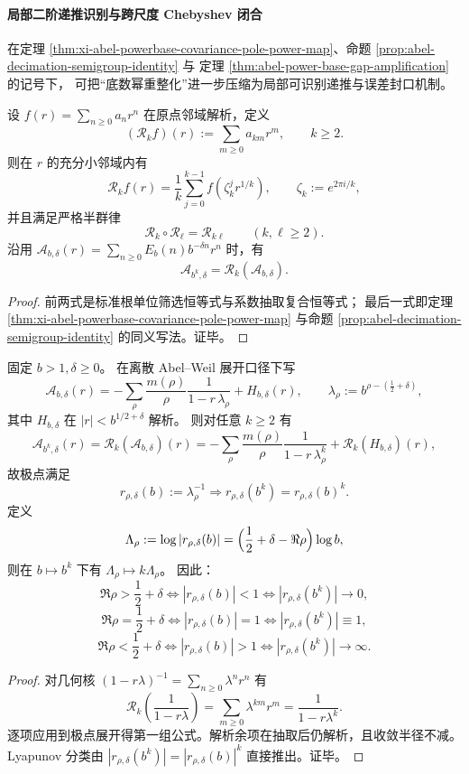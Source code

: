\paragraph{局部二阶递推识别与跨尺度 Chebyshev 闭合}
在定理 \ref{thm:xi-abel-powerbase-covariance-pole-power-map}、命题 \ref{prop:abel-decimation-semigroup-identity} 与
定理 \ref{thm:abel-power-base-gap-amplification} 的记号下，
可把“底数幂重整化”进一步压缩为局部可识别递推与误差封口机制。

\begin{proposition}[抽取算子的根单位滤波表示与半群闭合]\label{prop:xi-abel-Rk-root-filter-semigroup}
设 \(f(r)=\sum_{n\ge 0}a_n r^n\) 在原点邻域解析，定义
\[
(\mathcal R_k f)(r):=\sum_{m\ge 0}a_{km}r^m,\qquad k\ge 2.
\]
则在 \(r\) 的充分小邻域内有
\[
\mathcal R_k f(r)
=\frac1k\sum_{j=0}^{k-1}f\!\left(\zeta_k^j r^{1/k}\right),
\qquad
\zeta_k:=e^{2\pi i/k},
\]
并且满足严格半群律
\[
\mathcal R_k\circ\mathcal R_\ell=\mathcal R_{k\ell}\qquad(k,\ell\ge 2).
\]
沿用
\(
\mathcal A_{b,\delta}(r)=\sum_{n\ge 0}E_b(n)b^{-\delta n}r^n
\)
时，有
\[
\mathcal A_{b^k,\delta}=\mathcal R_k(\mathcal A_{b,\delta}).
\]
\end{proposition}
\begin{proof}
前两式是标准根单位筛选恒等式与系数抽取复合恒等式；
最后一式即定理 \ref{thm:xi-abel-powerbase-covariance-pole-power-map} 与命题
\ref{prop:abel-decimation-semigroup-identity} 的同义写法。证毕。
\end{proof}

\begin{theorem}\label{thm:xi-abel-pole-divisor-powermap-lyapunov}
固定 \(b>1,\delta\ge 0\)。
在离散 Abel--Weil 展开口径下写
\[
\mathcal A_{b,\delta}(r)
=-\sum_{\rho}\frac{m(\rho)}{\rho}\frac{1}{1-r\,\lambda_\rho}
+H_{b,\delta}(r),
\qquad
\lambda_\rho:=b^{\rho-(\frac12+\delta)},
\]
其中 \(H_{b,\delta}\) 在 \(|r|<b^{1/2+\delta}\) 解析。
则对任意 \(k\ge 2\) 有
\[
\mathcal A_{b^k,\delta}(r)
=\mathcal R_k(\mathcal A_{b,\delta})(r)
=-\sum_{\rho}\frac{m(\rho)}{\rho}\frac{1}{1-r\,\lambda_\rho^k}
+\mathcal R_k(H_{b,\delta})(r),
\]
故极点满足
\[
r_{\rho,\delta}(b):=\lambda_\rho^{-1}
\Longrightarrow
r_{\rho,\delta}(b^k)=r_{\rho,\delta}(b)^k.
\]
定义
\[
\Lambda_\rho:=\log|r_{\rho,\delta}(b)|=\Bigl(\frac12+\delta-\Re\rho\Bigr)\log b,
\]
则在 \(b\mapsto b^k\) 下有 \(\Lambda_\rho\mapsto k\Lambda_\rho\)。
因此：
\[
\Re\rho>\frac12+\delta\Longleftrightarrow |r_{\rho,\delta}(b)|<1\Longleftrightarrow |r_{\rho,\delta}(b^k)|\to 0,
\]
\[
\Re\rho=\frac12+\delta\Longleftrightarrow |r_{\rho,\delta}(b)|=1\Longleftrightarrow |r_{\rho,\delta}(b^k)|\equiv 1,
\]
\[
\Re\rho<\frac12+\delta\Longleftrightarrow |r_{\rho,\delta}(b)|>1\Longleftrightarrow |r_{\rho,\delta}(b^k)|\to \infty.
\]
\end{theorem}
\begin{proof}
对几何核 \((1-r\lambda)^{-1}=\sum_{n\ge 0}\lambda^n r^n\) 有
\[
\mathcal R_k\!\left(\frac{1}{1-r\lambda}\right)
=\sum_{m\ge 0}\lambda^{km}r^m
=\frac{1}{1-r\lambda^k}.
\]
逐项应用到极点展开得第一组公式。解析余项在抽取后仍解析，且收敛半径不减。
Lyapunov 分类由
\(
|r_{\rho,\delta}(b^k)|=|r_{\rho,\delta}(b)|^k
\)
直接推出。证毕。
\end{proof}

